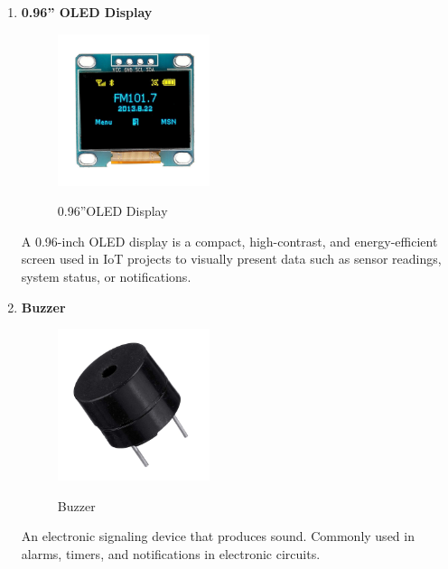 {\begin{enumerate}
    
    \item \textbf{0.96'' OLED Display}\\
    \begin{figure}[H]
            \centering
            \includegraphics[width=1.75in]{oled.jpg} \\
            \caption{0.96''OLED Display}
            \label{fig:oled} %
        \end{figure}
    A 0.96-inch OLED display is a compact, high-contrast, and energy-efficient screen used in IoT projects to visually present data such as sensor readings, system status, or notifications.

    \item \textbf{Buzzer}\\
    \begin{figure}[H]
            \centering
            \includegraphics[width=1.75in]{buzzer.jpg} \\
            \caption{Buzzer}
            \label{fig:buzzer} %
        \end{figure}
    An electronic signaling device that produces sound. Commonly used in alarms, timers, and notifications in electronic circuits.
    

\end{enumerate}}
